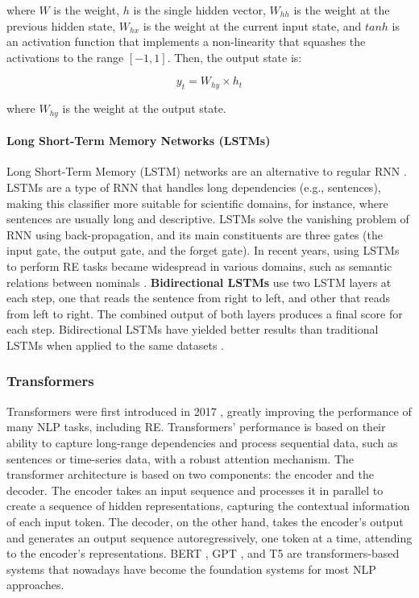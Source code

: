 where $W$ is the weight, $h$ is the single hidden vector, $W_{hh}$ is the weight at the previous hidden state, $W_{hx}$ is the weight at the current input state, and $tanh$ is an activation function that implements a non-linearity that squashes the activations to the range $[-1,1]$. Then, the output state is:

\begin{equation}
    y_t = W_{hy} \times h_{t}
\end{equation}

where $W_{hy}$ is the weight at the output state.

\paragraph{Long Short-Term Memory Networks (LSTMs)}

Long Short-Term Memory (LSTM) networks are an alternative to regular RNN \citep{hochreiter1997long}. LSTMs are a type of RNN that handles long dependencies (e.g., sentences), making this classifier more suitable for scientific domains, for instance, where sentences are usually long and descriptive. LSTMs solve the vanishing problem of RNN using back-propagation, and its main constituents are three gates (the input gate, the output gate, and the forget gate).
In recent years, using LSTMs to perform RE tasks became widespread in various domains, such as semantic relations between nominals \citep{miwa2016end}. \textbf{Bidirectional LSTMs} use two LSTM layers at each step, one that reads the sentence from right to left, and other that reads from left to right. The combined output of both layers produces a final score for each step. Bidirectional LSTMs have yielded better results than traditional LSTMs when applied to the same datasets \citep{zhang2015bidirectional}.

\subsubsection{Transformers}

Transformers were first introduced in 2017 \citep{vaswani2017attention}, greatly improving the performance of many NLP tasks, including RE. Transformers' performance is based on their ability to capture long-range dependencies and process sequential data, such as sentences or time-series data, with a robust attention mechanism. The transformer architecture is based on two components: the encoder and the decoder. The encoder takes an input sequence and processes it in parallel to create a sequence of hidden representations, capturing the contextual information of each input token. The decoder, on the other hand, takes the encoder's output and generates an output sequence autoregressively, one token at a time, attending to the encoder's representations. BERT \citep{devlin2019bert}, GPT \citep{radford2018improving}, and T5 \citep{raffel2020exploring} are transformers-based systems that nowadays have become the foundation systems for most NLP approaches.

